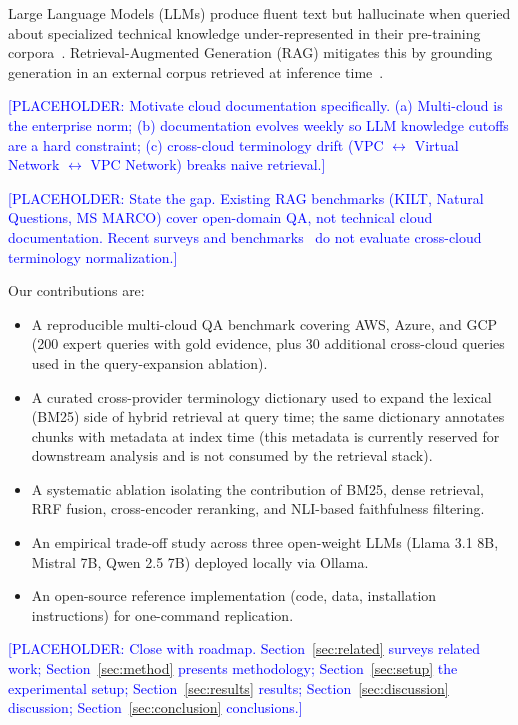 \documentclass[conference]{IEEEtran}
\begin{document}
Large Language Models (LLMs) produce fluent text but hallucinate when queried
about specialized technical knowledge under-represented in their
pre-training corpora~\cite{lewis2020rag,ji2023hallucination}.
Retrieval-Augmented Generation (RAG) mitigates this by grounding generation
in an external corpus retrieved at inference time~\cite{lewis2020rag,gao2024ragsurvey}.

\textcolor{blue}{[PLACEHOLDER: Motivate cloud documentation specifically. (a) Multi-cloud is the enterprise norm; (b) documentation evolves weekly so LLM knowledge cutoffs are a hard constraint; (c) cross-cloud terminology drift (VPC $\leftrightarrow$ Virtual Network $\leftrightarrow$ VPC Network) breaks naive retrieval.]}

\textcolor{blue}{[PLACEHOLDER: State the gap. Existing RAG benchmarks (KILT, Natural Questions, MS MARCO) cover open-domain QA, not technical cloud documentation. Recent surveys and benchmarks~\cite{yu2024ragsurvey,gan2025ragevaluation,wang2025corbrag} do not evaluate cross-cloud terminology normalization.]}

Our contributions are:
\begin{itemize}
  \item A reproducible multi-cloud QA benchmark covering AWS, Azure, and GCP (200 expert queries with gold evidence, plus 30 additional cross-cloud queries used in the query-expansion ablation).
  \item A curated cross-provider terminology dictionary used to expand the lexical (BM25) side of hybrid retrieval at query time; the same dictionary annotates chunks with metadata at index time (this metadata is currently reserved for downstream analysis and is not consumed by the retrieval stack).
  \item A systematic ablation isolating the contribution of BM25, dense retrieval, RRF fusion, cross-encoder reranking, and NLI-based faithfulness filtering.
  \item An empirical trade-off study across three open-weight LLMs (Llama 3.1 8B, Mistral 7B, Qwen 2.5 7B) deployed locally via Ollama.
  \item An open-source reference implementation (code, data, installation instructions) for one-command replication.
\end{itemize}

\textcolor{blue}{[PLACEHOLDER: Close with roadmap. Section~\ref{sec:related} surveys related work; Section~\ref{sec:method} presents methodology; Section~\ref{sec:setup} the experimental setup; Section~\ref{sec:results} results; Section~\ref{sec:discussion} discussion; Section~\ref{sec:conclusion} conclusions.]}
\end{document}
